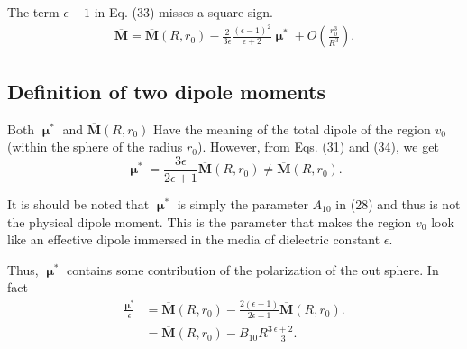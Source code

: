 \documentclass[11pt]{article}
\newcommand{\vct}[1]{\boldsymbol{\mathbf{#1}}}
\newcommand{\vMbar}{\overline{\vct{M}}}
\newcommand{\vmu}{\vct{\upmu}}
\begin{document}
The term $\epsilon - 1$ in Eq. (33) misses a square sign.
\begin{align}
\vMbar
=
\vMbar(R, r_0)
-
\frac{2}{3\epsilon}
\frac{(\epsilon - 1)^2}{\epsilon + 2}
\vct\upmu^*
+ O\left( \frac{ r_0^3 } { R^3 } \right).
\tag{33}
\end{align}



\subsection{Definition of two dipole moments}



Both $\vmu^*$ and $\vMbar(R, r_0)$
Have the meaning of the total dipole of the region $v_0$
(within the sphere of the radius $r_0$).
%
However, from Eqs. (31) and (34), we get
\begin{equation}
  \vmu^* = \frac { 3 \epsilon } { 2 \epsilon + 1 }
  \vMbar(R, r_0) \ne \vMbar(R, r_0).
\end{equation}

It is should be noted that
$\vmu^*$ is simply the parameter
$A_{10}$ in (28)
and thus is not the physical dipole moment.
%
This is the parameter
that makes the region $v_0$
look like an effective dipole
immersed in the media of dielectric constant $\epsilon$.

Thus,
$\vmu^*$
contains some contribution of the polarization of the out sphere.
In fact
\begin{align*}
  \frac{ \vmu^* } { \epsilon }
&=
  \vMbar(R, r_0)
  -
  \frac { 2 (\epsilon - 1) } { 2 \epsilon + 1 } \vMbar(R, r_0).
  \\
&=
  \vMbar(R, r_0)
  -
  B_{10} R^3 \frac{ \epsilon + 2 }{ 3 }.
\end{align*}




\end{document}

